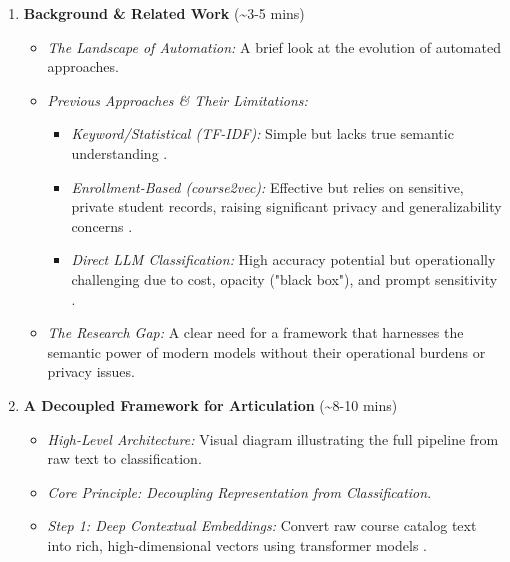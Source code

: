 \documentclass{article}
\begin{document}
\begin{enumerate}
    \item \textbf{Background \& Related Work} (\textasciitilde3-5 mins)
    \begin{itemize}
        \item \textit{The Landscape of Automation:} A brief look at the evolution of automated approaches.
        \item \textit{Previous Approaches \& Their Limitations:}
        \begin{itemize}
            \item \textit{Keyword/Statistical (TF-IDF):} Simple but lacks true semantic understanding \cite{AIZAWA200345}.
            \item \textit{Enrollment-Based (course2vec):} Effective but relies on sensitive, private student records, raising significant privacy and generalizability concerns \cite{PardosCourse2Vec2019, slade10.1177/0002764213479366}.
            \item \textit{Direct LLM Classification:} High accuracy potential but operationally challenging due to cost, opacity ("black box"), and prompt sensitivity \cite{Errica2024WhatDI, Sclar2023QuantifyingLM}.
        \end{itemize}
        \item \textit{The Research Gap:} A clear need for a framework that harnesses the semantic power of modern models without their operational burdens or privacy issues.
    \end{itemize}

    \item \textbf{A Decoupled Framework for Articulation} (\textasciitilde8-10 mins)
    \begin{itemize}
        \item \textit{High-Level Architecture:} Visual diagram illustrating the full pipeline from raw text to classification.
        \item \textit{Core Principle: Decoupling Representation from Classification}.
        \item \textit{Step 1: Deep Contextual Embeddings:} Convert raw course catalog text into rich, high-dimensional vectors using transformer models \cite{devlin2019bertpretrainingdeepbidirectional}.
        

\end{itemize}
\end{enumerate}
\end{document}
